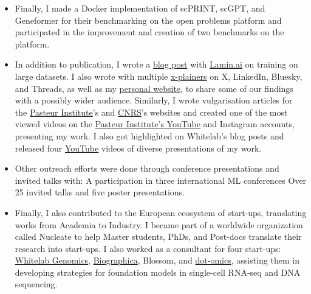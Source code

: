 \begin{itemize}
 \item Finally, I made a Docker implementation of \gls{scPRINT}, \gls{scGPT}, and Geneformer for their benchmarking on the open problems platform and participated in the improvement and creation of two benchmarks on the platform.
\item In addition to publication, I wrote a \href{https://blog.lamin.ai/arrayloader-benchmarks}{blog post} with \href{https://lamin.ai}{Lamin.ai} on training on large datasets. I also wrote with multiple \href{https://x.com/jkobject}{x-plainers} on X, LinkedIn, Bluesky, and Threads, as well as my \href{https://www.jkobject.com}{personal website}, to share some of our findings with a possibly wider audience. Similarly, I wrote vulgarisation articles for the \href{https://www.pasteur.fr/fr/journal-recherche/videos/langage-cellules}{Pasteur Institute}'s and \href{https://www.insb.cnrs.fr/fr/cnrsinfo/scprint-le-premier-modele-dia-francais-pour-dechiffrer-les-reseaux-genetiques}{\gls{CNRS}}'s websites and created one of the most viewed videos on the \href{https://www.youtube.com/watch?v=bgtcDs5EXY8}{Pasteur Institute's YouTube} and Instagram accounts, presenting my work. I also got highlighted on Whitelab's blog posts and released four \href{https://www.youtube.com/@jkobject}{YouTube} videos of diverse presentations of my work.
 \item Other outreach efforts were done through conference presentations and invited talks with:
   \subitem A participation in three international \gls{ML} conferences
   \subitem Over 25 invited talks and five poster presentations.
 \item Finally, I also contributed to the European ecosystem of start-ups, translating works from Academia to Industry. I became part of a worldwide organization called Nucleate to help Master students, PhDs, and Post-docs translate their research into start-ups. I also worked as a consultant for four start-ups: \href{https://whitelabgx.com/}{Whitelab Genomics}, \href{https://graphica.bio/}{Biographica}, Blossom, and \href{https://www.dotomics.bio/}{dot-omics}, assisting them in developing strategies for foundation models in single-cell \gls{RNA-seq} and \gls{DNA} sequencing.
\end{itemize}
